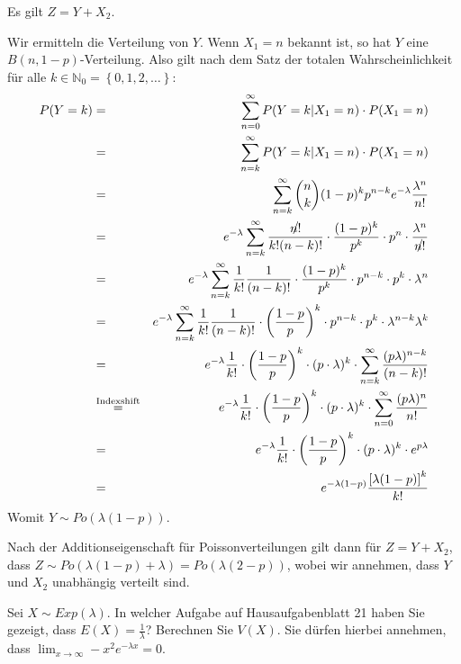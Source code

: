 \begin{Answer}
	\Question Es gilt $Z=Y+X_2$.
	
	\Question
	Wir ermitteln die Verteilung von $Y$. Wenn $X_1=n$ bekannt ist, so hat $Y$ eine $B(n,1-p)$-Verteilung. Also gilt nach dem Satz der totalen Wahrscheinlichkeit für alle $k\in\mathbb{N}_0=\left\lbrace0,1,2,\dots\right\rbrace$:
	\begin{eqnarray*}
		P(Y=k)&=&\sum_{n=0}^\infty P(Y=k\vert X_1=n)\cdot P(X_1=n)\\
		&=&\sum_{n=k}^\infty P(Y=k\vert X_1=n)\cdot P(X_1=n)\\
		&=&\sum_{n=k}^\infty \binom{n}{k}(1-p)^kp^{n-k}e^{-\lambda}\frac{\lambda^n}{n!}\\
		&=&e^{-\lambda}\sum_{n=k}^\infty\frac{\slashed{n!}}{k!(n-k)!}\cdot\frac{(1-p)^k}{p^k}\cdot p^n\cdot \frac{\lambda^n}{\slashed{n!}}\\
		&=&e^{-\lambda}\sum_{n=k}^\infty\frac{1}{k!}\frac{1}{(n-k)!}\cdot\frac{(1-p)^k}{p^k}\cdot p^{n-k}\cdot p^k\cdot \lambda^n\\
		&=&e^{-\lambda}\sum_{n=k}^\infty\frac{1}{k!}\frac{1}{(n-k)!}\cdot\left(\frac{1-p}{p}\right)^k\cdot p^{n-k}\cdot p^k\cdot \lambda^{n-k}\lambda^k\\
		&=&e^{-\lambda}\frac{1}{k!}\cdot\left(\frac{1-p}{p}\right)^k\cdot (p\cdot\lambda)^k\cdot \sum_{n=k}^\infty\frac{(p\lambda)^{n-k}}{(n-k)!}\\
		&\stackrel{\text{Indexshift}}{=}&e^{-\lambda}\frac{1}{k!}\cdot\left(\frac{1-p}{p}\right)^k\cdot (p\cdot\lambda)^k\cdot \sum_{n=0}^\infty\frac{(p\lambda)^{n}}{n!}\\
		&=&e^{-\lambda}\frac{1}{k!}\cdot\left(\frac{1-p}{p}\right)^k\cdot (p\cdot\lambda)^k\cdot e^{p\lambda}\\
		&=&e^{-\lambda(1-p)}\frac{\left[\lambda(1-p)\right]^k}{k!}
	\end{eqnarray*}
	Womit $Y\sim Po(\lambda(1-p))$. 
	
	\Question Nach der Additionseigenschaft für Poissonverteilungen gilt dann für $Z=Y+X_2$, dass $Z\sim Po(\lambda(1-p)+\lambda)=Po(\lambda(2-p))$, wobei wir annehmen, dass $Y$ und $X_2$ unabhängig verteilt sind.
\end{Answer}

\begin{Exercise}
	Sei $X\sim Exp(\lambda)$. 
	\Question In welcher Aufgabe auf Hausaufgabenblatt 21 haben Sie gezeigt, dass $E(X)=\frac{1}{\lambda}$?
	\Question Berechnen Sie $V(X)$. Sie dürfen hierbei annehmen, dass $\lim_{x\to\infty} -x^2e^{-\lambda x}=0$.
\end{Exercise}
	
